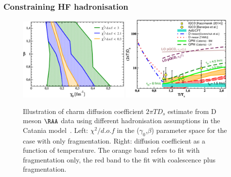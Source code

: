 


\subsubsection{Constraining HF hadronisation}
\label{sec:HFhadro3}


\begin{figure}[!hb]
\begin{center}
\includegraphics[width=0.49\textwidth]{hf/figures/chi2_vers2.pdf}
\includegraphics[width=0.49\textwidth]{hf/figures/Ds_lQCD_CHI2_COAL-FRAGM.pdf}
\end{center}
\caption{Illustration of charm diffusion coefficient $2\pi T D_s$ estimate from D meson $\RAA$ data using different hadronisation assumptions in the Catania model~\cite{Das:2015ana,Das:2013kea}. Left: $\chi^2/d.o.f$ in the ($\gamma_0$,$\beta$)  parameter space for the case with only fragmentation.
Right: diffusion coefficient as a function of temperature. The orange band refers to fit 
with fragmentation only, the red band to the fit with coalescence plus fragmentation.}
\label{Fig:CHI2}
\end{figure}


